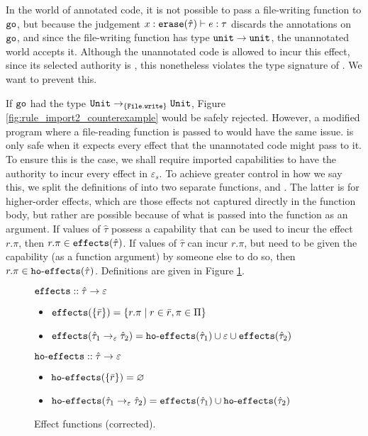 In the world of annotated code, it is not possible to pass a
file-writing function to $\mathtt{go}$, but because the judgement
$x: \mathtt{erase}(\hat \tau) \vdash e: \tau$ discards the annotations on
$\mathtt{go}$, and since the file-writing function has type
$\mathtt{unit} \rightarrow \mathtt{unit}$, the unannotated world accepts it.
Although the unannotated code is allowed to incur this effect, since
its selected authority is , this nonetheless violates the type signature of . We want to prevent this.

If $\mathtt{go}$ had the type $\mathtt{Unit} \rightarrow_{\{ \mathtt{File.write} \}} \mathtt{Unit}$,
Figure \ref{fig:rule_import2_counterexample} would be safely rejected. However,
a modified program where a file-reading function is passed to  would have
the same issue.  is only safe when it expects every effect that the
unannotated code might pass to it. To ensure this is the case, we shall require
imported capabilities to have the authority to incur every effect in $\varepsilon_s$.
To achieve greater control in how we say this, we split the definitions of
 into two separate functions,  and
. The latter is for higher-order effects, which are those
effects not captured directly in the function body, but rather are possible because of
what is passed into the function as an argument. If values of $\hat \tau$ possess
a capability that can be used to incur the effect $r.\pi$, then $r.\pi \in \mathtt{effects}(\hat \tau)$.
If values of $\hat \tau$ can incur $r.\pi$, but need to be given the capability (as a
function argument) by someone else to do so, then $r.\pi \in \mathtt{ho \hbox{-} effects}(\hat \tau)$.
Definitions are given in Figure \ref{fig:fx_defns}.

\begin{figure}
\vspace{-0.2cm}

$\mathtt{effects} :: \hat \tau \rightarrow \varepsilon$

\begin{itemize}
	\setlength\itemsep{-0.2em}
	\item[] $\mathtt{effects}(\{ \bar r \}) = \{ r.\pi \mid r \in \bar r, \pi \in \Pi \}$
	\item[] $\mathtt{effects}(\hat \tau_1 \rightarrow_{\varepsilon} \hat \tau_2) = \mathtt{ho \hbox{-} effects}(\hat \tau_1) \cup \varepsilon \cup \mathtt{effects}(\hat \tau_2)$
\end{itemize}

$\mathtt{ho \hbox{-} effects} :: \hat \tau \rightarrow \varepsilon$

\begin{itemize}
	\setlength\itemsep{-0.2em}
	\item[] $\mathtt{ho \hbox{-} effects}(\{ \bar r \}) = \varnothing$
	\item[] $\mathtt{ho \hbox{-} effects}(\hat \tau_1 \rightarrow_{\varepsilon} \hat \tau_2) = \mathtt{effects}(\hat \tau_1) \cup \mathtt{ho \hbox{-} effects}(\hat \tau_2)$
\end{itemize}

\vspace{-0.5cm}
\caption{Effect functions (corrected).}
\vspace{-0.5cm}
\label{fig:fx_defns}
\end{figure}

